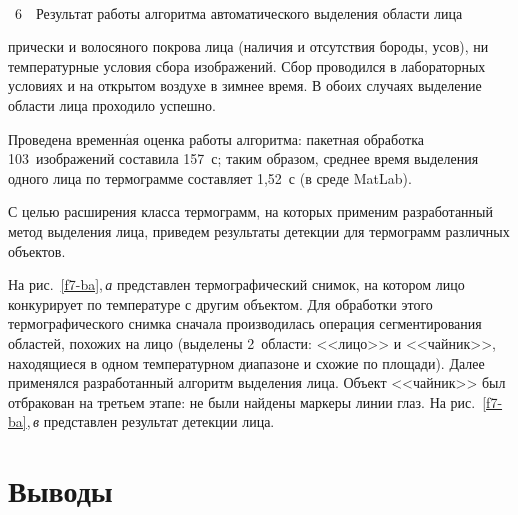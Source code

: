 \begin{multicols}{2}
\columnbreak

    \begin{center} %
\vspace*{1pt}
\mbox{%
\epsfxsize=79mm
}
\end{center}
{{\figurename~6}\ \ \small{Результат работы алгоритма автоматического выделения области лица}}

\medskip

\addtocounter{figure}{1}


\noindent

\noindent
прически и волосяного покрова лица (наличия и отсутствия бороды, 
усов), ни температурные условия сбора изображений. Сбор проводился в 
лабораторных условиях и на открытом воздухе в зимнее время.
В обоих случаях выделение области 
лица проходило успешно. 

  
  
  Проведена временн$\acute{\mbox{а}}$я оценка работы алгоритма: пакетная 
обработка 103~изображений составила 157~с; таким образом, среднее время 
выделения одного лица по термограмме составляет 1,52~с (в среде MatLab).
  
  С целью расширения класса термограмм, на которых применим разработанный 
метод выделения лица, приведем результаты детекции для термограмм
различных объектов. 
  
  
  На рис.~\ref{f7-ba},\,\textit{а} представлен термографический снимок, на 
котором лицо конкурирует по температуре с другим объектом. Для обработки 
этого термографического снимка сначала производилась операция 
сегментирования областей, похожих на лицо (выделены 2~области: <<лицо>> и 
<<чайник>>, находящиеся в одном температурном диапазоне и схожие по 
площади). Далее применялся разработанный алгоритм выделения лица. Объект 
<<чайник>> был отбракован на третьем этапе: не были найдены маркеры линии глаз. На рис.~\ref{f7-ba},\,\textit{в} 
представлен результат детекции лица.

\vspace*{-6pt}

\section{Выводы}


\end{multicols}
